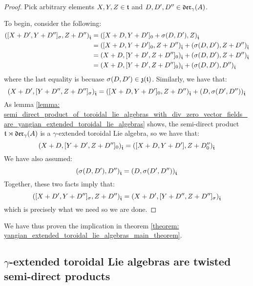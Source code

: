             \begin{proof}
                Pick arbitrary elements $X, Y, Z \in \mathfrak{t}$ and $D, D', D'' \in \mathfrak{der}_{\gamma}(A)$.
                
                To begin, consider the following:
                    $$
                        \begin{aligned}
                            ([X + D', Y + D'']_{\sigma}, Z + D'')_{\hat{\mathfrak{t}}} & = ([X + D, Y + D']_0 + \sigma(D, D'), Z)_{\hat{\mathfrak{t}}}
                            \\
                            & = ([X + D, Y + D']_0, Z + D'')_{\hat{\mathfrak{t}}} + (\sigma(D, D'), Z + D'')_{\hat{\mathfrak{t}}}
                            \\
                            & = (X + D, [Y + D', Z + D'']_0)_{\hat{\mathfrak{t}}} + (\sigma(D, D'), Z + D'')_{\hat{\mathfrak{t}}}
                            \\
                            & = (X + D, [Y + D', Z + D'']_0)_{\hat{\mathfrak{t}}} + (\sigma(D, D'), D'')_{\hat{\mathfrak{t}}}
                        \end{aligned}
                    $$
                where the last equality is becuase $\sigma(D, D') \in \mathfrak{z}(\mathfrak{t})$. Similarly, we have that:
                    $$(X + D', [Y + D'', Z + D'']_{\sigma})_{\hat{\mathfrak{t}}} = ([X + D, Y + D']_0, Z + D'')_{\hat{\mathfrak{t}}} + (D, \sigma(D', D''))_{\hat{\mathfrak{t}}}$$
                As lemma \ref{lemma: semi_direct_product_of_toroidal_lie_algebras_with_div_zero_vector_fields_are_yangian_extended_toroidal_lie_algebras} shows, the semi-direct product $\mathfrak{t} \rtimes \mathfrak{der}_{\gamma}(A)$ is a $\gamma$-extended toroidal Lie algebra, so we have that:
                    $$(X + D, [Y + D', Z + D'']_0)_{\hat{\mathfrak{t}}} = ([X + D, Y + D'], Z + D''_0)_{\hat{\mathfrak{t}}}$$
                We have also assumed:
                    $$(\sigma(D, D'), D'')_{\hat{\mathfrak{t}}} = (D, \sigma(D', D''))_{\hat{\mathfrak{t}}}$$
                Together, these two facts imply that:
                    $$([X + D', Y + D'']_{\sigma}, Z + D'')_{\hat{\mathfrak{t}}} = (X + D', [Y + D'', Z + D'']_{\sigma})_{\hat{\mathfrak{t}}}$$
                which is precisely what we need so we are done.
            \end{proof}

        We have thus proven the  implication in theorem \ref{theorem: yangian_extended_toroidal_lie_algebras_main_theorem}.

    \subsection{\texorpdfstring{$\gamma$}{}-extended toroidal Lie algebras are twisted semi-direct products}

